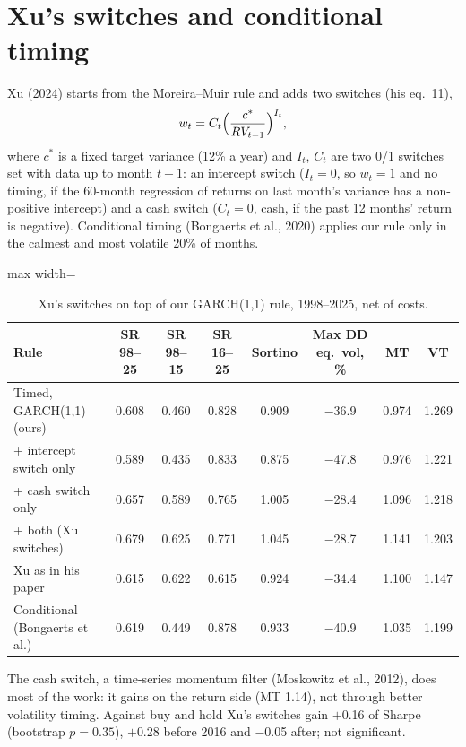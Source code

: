 \section{Xu's switches and conditional timing}\label{app:xu}
Xu (2024) starts from the Moreira--Muir rule and adds two switches (his eq.~11),
\[
w_t=C_t\Bigl(\frac{c^*}{RV_{t-1}}\Bigr)^{I_t},
\]
where $c^*$ is a fixed target variance (12\% a year) and $I_t$, $C_t$ are two 0/1 switches set with data up to month $t-1$: an intercept switch ($I_t=0$, so $w_t=1$ and no timing, if the 60-month regression of returns on last month's variance has a non-positive intercept) and a cash switch ($C_t=0$, cash, if the past 12 months' return is negative). Conditional timing (Bongaerts et al., 2020) applies our rule only in the calmest and most volatile 20\% of months.

\begin{table}[htbp]
\centering\small
\caption{Xu's switches on top of our GARCH(1,1) rule, 1998--2025, net of costs.}\label{tab:xu}
\begin{adjustbox}{max width=\linewidth}\begin{tabular}{@{}lccccccc@{}}
\toprule
Rule & SR 98--25 & SR 98--15 & SR 16--25 & Sortino & Max DD eq.\ vol, \% & MT & VT\\
\midrule
Timed, GARCH(1,1) (ours) & 0.608 & 0.460 & 0.828 & 0.909 & $-$36.9 & 0.974 & 1.269\\
+ intercept switch only & 0.589 & 0.435 & 0.833 & 0.875 & $-$47.8 & 0.976 & 1.221\\
+ cash switch only & 0.657 & 0.589 & 0.765 & 1.005 & $-$28.4 & 1.096 & 1.218\\
+ both (Xu switches) & 0.679 & 0.625 & 0.771 & 1.045 & $-$28.7 & 1.141 & 1.203\\
Xu as in his paper & 0.615 & 0.622 & 0.615 & 0.924 & $-$34.4 & 1.100 & 1.147\\
Conditional (Bongaerts et al.) & 0.619 & 0.449 & 0.878 & 0.933 & $-$40.9 & 1.035 & 1.199\\
\bottomrule
\end{tabular}\end{adjustbox}
\end{table}

The cash switch, a time-series momentum filter (Moskowitz et al., 2012), does most of the work: it gains on the return side (MT 1.14), not through better volatility timing. Against buy and hold Xu's switches gain $+$0.16 of Sharpe (bootstrap $p=0.35$), $+$0.28 before 2016 and $-$0.05 after; not significant.

